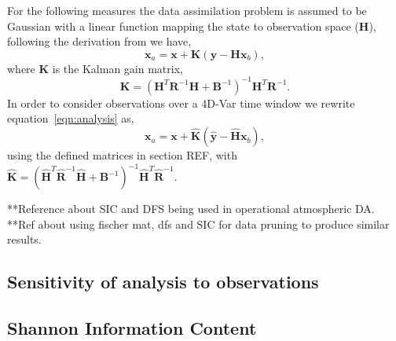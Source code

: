 \documentclass[11pt]{article}
\begin{document}
For the following measures the data assimilation problem is assumed to be Gaussian with a linear function mapping the state to  observation space (\textbf{H}), following the derivation from \citet{kalnay2003atmospheric} we have,
\begin{equation}
\textbf{x}_{a} = \textbf{x} + \textbf{K}(\textbf{y} - \textbf{H}\textbf{x}_{b}), \label{eqn:analysis}
\end{equation}
where $\textbf{K}$ is the Kalman gain matrix,
\begin{equation}
\textbf{K} = (\textbf{H}^{T}\textbf{R}^{-1}\textbf{H} + \textbf{B}^{-1})^{-1}\textbf{H}^{T}\textbf{R}^{-1}.
\end{equation}
In order to consider observations over a 4D-Var time window we rewrite equation~\eqref{eqn:analysis} as,
\begin{equation}
\textbf{x}_{a} = \textbf{x} + \hat{\textbf{K}}(\hat{\textbf{y}} - \hat{\textbf{H}}\textbf{x}_{b}),
\end{equation}
using the defined matrices in section {\color{red} REF}, with $\hat{\textbf{K}} = (\hat{\textbf{H}}^{T}\hat{\textbf{R}}^{-1}\hat{\textbf{H}} + \textbf{B}^{-1})^{-1}\hat{\textbf{H}}^{T}\hat{\textbf{R}}^{-1}.$ 

\citep{fisher2003estimation} **Reference about SIC and DFS being used in operational atmospheric DA.
\citep{singh2013practical} **Ref about using fischer mat, dfs and SIC for data pruning to produce similar results.

\subsection{Sensitivity of analysis to observations}


\subsection{Shannon Information Content}%
\end{document}
